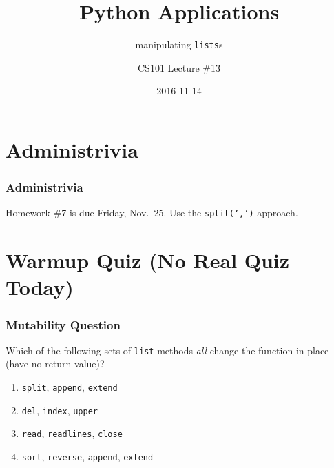 \documentclass[11pt]{beamer}
\title{Python Applications}
\subtitle{manipulating \texttt{lists}s}
\author{CS101 Lecture \#13}
\date{2016-11-14}
\begin{document}
  \setcounter{showProgressBar}{0}
  \setcounter{showSlideNumbers}{0}

\frame{\titlepage}

\setcounter{framenumber}{0}
\setcounter{showProgressBar}{1}
\setcounter{showSlideNumbers}{1}

\section{Administrivia}

\begin{frame}
  \frametitle{Administrivia}
  \Enlarge

  \begin{itemize}
  \myitem  Homework \#7 is due Friday, Nov.\ 25.
  \mysubitem  Use the \texttt{split(',')} approach.
  \end{itemize}
\end{frame}


\section{Warmup Quiz (No Real Quiz Today)}

\begin{frame}[fragile]
  \frametitle{Mutability Question}
  \Enlarge

  Which of the following sets of \texttt{list} methods \emph{all} change the function in place (have no return value)?

  \begin{enumerate}[label=\Alph*]
  \item  \texttt{split}, \texttt{append}, \texttt{extend}
  \item  \texttt{del}, \texttt{index}, \texttt{upper}
  \item  \texttt{read}, \texttt{readlines}, \texttt{close}
  \item  \texttt{sort}, \texttt{reverse}, \texttt{append}, \texttt{extend}
  \end{enumerate}
\end{frame}
\end{document}
